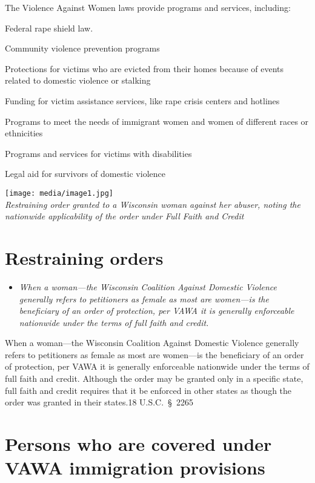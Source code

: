 The Violence Against Women laws provide programs and services,
including:

Federal rape shield law.

Community violence prevention programs

Protections for victims who are evicted from their homes because of
events related to domestic violence or stalking

Funding for victim assistance services, like rape crisis centers and
hotlines

Programs to meet the needs of immigrant women and women of different
races or ethnicities

Programs and services for victims with disabilities

Legal aid for survivors of domestic violence

\texttt{[image: media/image1.jpg]}\\
\emph{Restraining order granted to a Wisconsin woman against her abuser,
noting the nationwide applicability of the order under Full Faith and
Credit}

\section{Restraining orders}\label{restraining-orders}

\begin{itemize}
\item
  \emph{When a woman---the Wisconsin Coalition Against Domestic Violence
  generally refers to petitioners as female as most are women---is the
  beneficiary of an order of protection, per VAWA it is generally
  enforceable nationwide under the terms of full faith and credit.}
\end{itemize}

When a woman---the Wisconsin Coalition Against Domestic Violence
generally refers to petitioners as female as most are women---is the
beneficiary of an order of protection, per VAWA it is generally
enforceable nationwide under the terms of full faith and credit.
Although the order may be granted only in a specific state, full faith
and credit requires that it be enforced in other states as though the
order was granted in their states.18 U.S.C.~§~2265

\section{Persons who are covered under VAWA immigration
provisions}\label{persons-who-are-covered-under-vawa-immigration-provisions}


